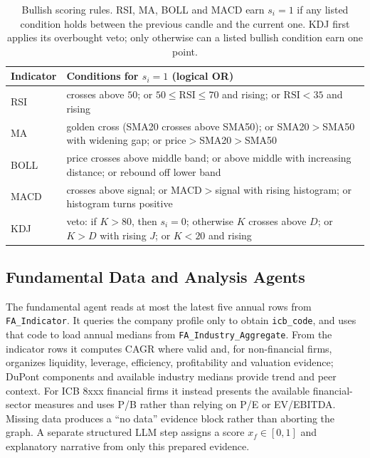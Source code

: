 \documentclass[runningheads]{llncs}
\begin{document}
\begin{table}[t]
\centering
\caption{Bullish scoring rules. RSI, MA, BOLL and MACD earn $s_i=1$ if any
listed condition holds between the previous candle and the current one. KDJ
first applies its overbought veto; only otherwise can a listed bullish condition
earn one point.}
\label{tab:scoring}
\setlength{\extrarowheight}{2pt}
\renewcommand{\arraystretch}{1.0}
\begin{tabularx}{\textwidth}{@{}lX@{}}
\toprule
Indicator & Conditions for $s_i = 1$ (logical OR) \\
\midrule
RSI  & crosses above $50$; or $50\!\leq\!\mathrm{RSI}\!\leq\!70$ and rising; or $\mathrm{RSI}\!<\!35$ and rising \\
\addlinespace
MA   & golden cross (SMA20 crosses above SMA50); or SMA20$>$SMA50 with widening gap; or price$>$SMA20$>$SMA50 \\
\addlinespace
BOLL & price crosses above middle band; or above middle with increasing distance; or rebound off lower band \\
\addlinespace
MACD & crosses above signal; or MACD$>$signal with rising histogram; or histogram turns positive \\
\addlinespace
KDJ  & veto: if $K>80$, then $s_i=0$; otherwise $K$ crosses above $D$; or $K>D$ with rising $J$; or $K<20$ and rising \\
\bottomrule
\end{tabularx}
\end{table}

\subsection{Fundamental Data and Analysis Agents}
\label{sec:fundamental}

The fundamental agent reads at most the latest five annual rows from
\texttt{FA\_Indicator}. It queries the company profile only to obtain
\texttt{icb\_code}, and uses that code to load annual medians from
\texttt{FA\_Industry\_Aggregate}. From the indicator rows it
computes CAGR where valid and, for non-financial firms, organizes liquidity,
leverage, efficiency, profitability and valuation evidence; DuPont components
and available industry medians provide trend and peer context. For ICB 8xxx
financial firms it instead presents the available financial-sector measures and
uses P/B rather than relying on P/E or EV/EBITDA. Missing data produces a
``no data'' evidence block rather than aborting the graph. A separate structured
LLM step assigns a score $x_f\in[0,1]$ and explanatory narrative from only this
prepared evidence.
\end{document}
